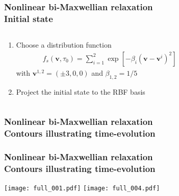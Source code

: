 \begin{frame}
  \frametitle{Nonlinear bi-Maxwellian relaxation\\
    \textcolor{egg}{\large Initial state}}
  \begin{columns}
    \begin{column}{0.5\textwidth}
      \begin{enumerate}
      \item<1-> Choose a  distribution function
        \begin{align*}
          f_s(\mathbf{v},\tau_0)=\sum_{i=1}^{2}\exp[-\beta_i(\mathbf{v}-\mathbf{v}^i)^2]
        \end{align*}
        with $\mathbf{v}^{1,2}=(\pm 3,0,0)$ and $\beta_{1,2}=1/5$
      \item<2-> Project the initial state to the RBF basis
      \end{enumerate}
    \end{column}
    \begin{column}{0.5\textwidth}
    \end{column}
  \end{columns}
\end{frame}

\begin{frame}
  \frametitle{Nonlinear bi-Maxwellian relaxation\\
    \textcolor{egg}{\large Contours illustrating time-evolution}}
  \begin{center}
  \end{center}
\end{frame}
  
\begin{frame}
  \frametitle{Nonlinear bi-Maxwellian relaxation\\
    \textcolor{egg}{\large Contours illustrating time-evolution}}
  \begin{center}
    {\texttt{[image: full\_001.pdf]}}
    {\texttt{[image: full\_004.pdf]}}
  \end{center}
\end{frame}
  
